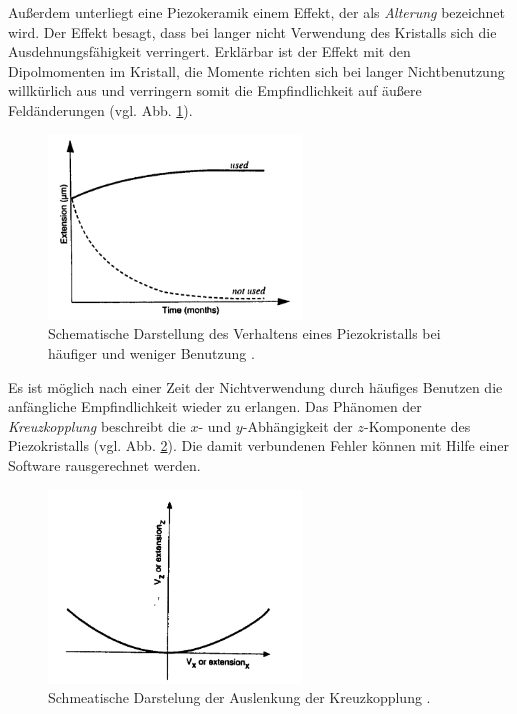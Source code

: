 Außerdem unterliegt eine Piezokeramik einem Effekt, der als \emph{Alterung} bezeichnet wird. Der Effekt besagt,
dass bei langer nicht Verwendung des Kristalls sich die Ausdehnungsfähigkeit verringert. Erklärbar ist der Effekt mit den %
Dipolmomenten im Kristall, die Momente richten sich bei langer Nichtbenutzung willkürlich aus und verringern %
somit die Empfindlichkeit auf äußere Feldänderungen (vgl. Abb. \ref{fig: ageing}).
\begin{figure}[!h]
  \centering
  \includegraphics[width=0.6\textwidth]{./pics/ageing.png}
  \caption{Schematische Darstellung des Verhaltens eines Piezokristalls bei häufiger und weniger Benutzung \cite{rtm}.} %
  \label{fig: ageing}
\end{figure}
Es ist möglich nach einer Zeit der Nichtverwendung
durch häufiges Benutzen die anfängliche Empfindlichkeit wieder zu erlangen.
Das Phänomen der \emph{Kreuzkopplung} beschreibt die $x$- und $y$-Abhängigkeit der $z$-Komponente des Piezokristalls (vgl. Abb. \ref{fig: cross_copeling}). %
Die damit verbundenen Fehler können mit Hilfe einer Software rausgerechnet werden. %
\begin{figure}[!h]
  \centering
  \includegraphics[width=0.6\textwidth]{./pics/cross_copling.png}
  \caption{Schmeatische Darstelung der Auslenkung der Kreuzkopplung \cite{rtm}.}
  \label{fig: cross_copeling}
\end{figure}

